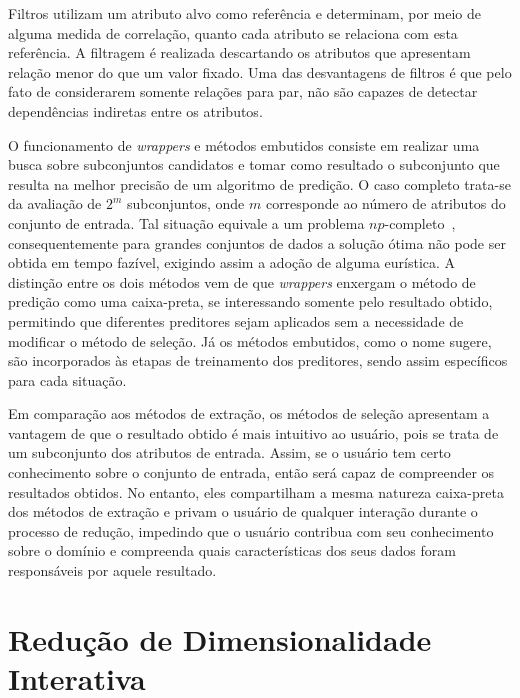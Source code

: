 Filtros utilizam um atributo alvo como referência e determinam, por meio de alguma medida de correlação, quanto cada atributo se relaciona com esta referência. 
A filtragem é realizada descartando os atributos que apresentam relação menor do que um valor fixado.
Uma das desvantagens de filtros é que pelo fato de considerarem somente relações para par, não são capazes de detectar dependências indiretas entre os atributos. 

O funcionamento de \emph{wrappers} e métodos embutidos consiste em realizar uma busca sobre subconjuntos candidatos e tomar como resultado o subconjunto que resulta na melhor precisão de um algoritmo de predição.
O caso completo trata-se da avaliação de $2^m$ subconjuntos, onde $m$ corresponde ao número de atributos do conjunto de entrada. 
Tal situação equivale a um problema $np$-completo~\cite{Amaldi1998}, consequentemente para grandes conjuntos de dados a solução ótima não pode ser obtida em tempo fazível, exigindo assim a adoção de alguma eurística. 
A distinção entre os dois métodos vem de que \emph{wrappers} enxergam o método de predição como uma caixa-preta, se interessando somente pelo resultado obtido, permitindo que diferentes preditores sejam aplicados sem a necessidade de modificar o método de seleção. Já os métodos embutidos, como o nome sugere, são incorporados às etapas de treinamento dos preditores, sendo assim específicos para cada situação. 

Em comparação aos métodos de extração, os métodos de seleção apresentam a vantagem de que o resultado obtido é mais intuitivo ao usuário, pois se trata de um subconjunto dos atributos de entrada. 
Assim, se o usuário tem certo conhecimento sobre o conjunto de entrada, então será capaz de compreender os resultados obtidos.
No entanto, eles compartilham a mesma natureza caixa-preta dos métodos de extração e privam o usuário de qualquer interação durante o processo de redução, impedindo que o usuário contribua com seu conhecimento sobre o domínio e compreenda quais características dos seus dados foram responsáveis por aquele resultado.

\section{Redução de Dimensionalidade Interativa}

